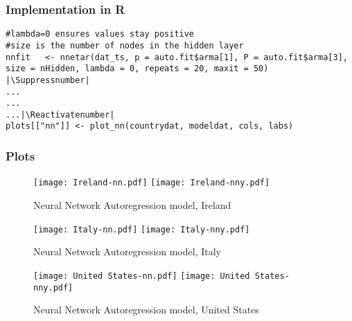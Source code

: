 \subsubsection{Implementation in R}

\begin{lstlisting}[breaklines = true, escapeinside=||, tabsize = 4, caption = {Algorithm for NNAR Model}]
#lambda=0 ensures values stay positive
#size is the number of nodes in the hidden layer
nnfit   <- nnetar(dat_ts, p = auto.fit$arma[1], P = auto.fit$arma[3], size = nHidden, lambda = 0, repeats = 20, maxit = 50)  |\Suppressnumber|
...
...
...|\Reactivatenumber|
plots[["nn"]] <- plot_nn(countrydat, modeldat, cols, labs)
\end{lstlisting}

\subsubsection{Plots}

\begin{figure}[H]
  \texttt{[image: Ireland-nn.pdf]} \label{fig:ireland-nn}
\endminipage\hfill
{}
  \texttt{[image: Ireland-nny.pdf]} \label{fig:ireland-nny}
\endminipage
\caption{Neural Network Autoregression model, Ireland}
\end{figure}

\begin{figure}[H]
  \texttt{[image: Italy-nn.pdf]} \label{fig:italy-nn}
\endminipage\hfill
{}
  \texttt{[image: Italy-nny.pdf]} \label{fig:italy-nny}
\endminipage
\caption{Neural Network Autoregression model, Italy}
\end{figure}

\begin{figure}[H]
  \texttt{[image: United States-nn.pdf]} \label{fig:usa-nn}
\endminipage\hfill
{}
  \texttt{[image: United States-nny.pdf]} \label{fig:usa-nny}
\endminipage
\caption{Neural Network Autoregression model, United States}
\end{figure}
